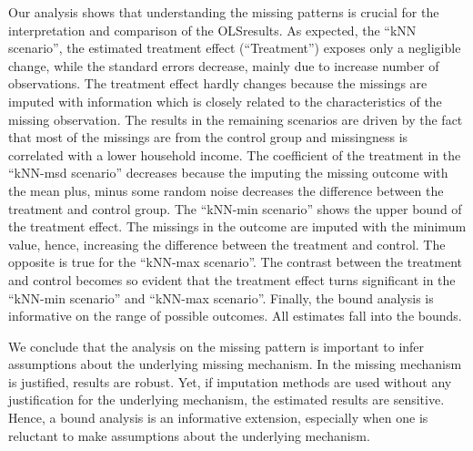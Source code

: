 Our analysis shows that understanding the missing patterns is crucial for the interpretation and comparison of the \ac{OLS}results. As expected, the ``kNN scenario'', the estimated treatment effect (``Treatment'') exposes only a negligible change, while the standard errors decrease, mainly due to increase number of observations. The treatment effect hardly changes because the missings are imputed with information which is closely related to the characteristics of the missing observation. The results in the remaining scenarios are driven by the fact that most of the missings are from the control group and missingness is correlated with a lower household income. The coefficient of the treatment in the ``kNN-msd scenario'' decreases because the imputing the missing outcome with the mean plus, minus some random noise decreases the difference between the treatment and control group. The ``kNN-min scenario'' shows the upper bound of the treatment effect. The missings in the outcome are imputed with the minimum value, hence, increasing the difference between the treatment and control. The opposite is true for the ``kNN-max scenario''. The contrast between the treatment and control becomes so evident that the treatment effect turns significant in the ``kNN-min scenario'' and ``kNN-max scenario''. Finally, the bound analysis is informative on the range of possible outcomes. All estimates fall into the bounds.

We conclude that the analysis on the missing pattern is important to infer assumptions about the underlying missing mechanism. In the missing mechanism is justified, results are robust. Yet, if imputation methods are used without any justification for the underlying mechanism, the estimated results are sensitive. Hence, a bound analysis is an informative extension, especially when one is reluctant to make assumptions about the underlying mechanism.